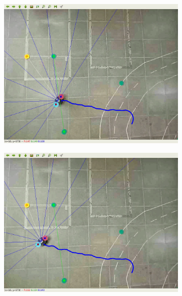 \begin{figure}[htbp]
\begin{subfigure}[b]{0.115\textwidth}
        \includegraphics[width=\textwidth]{images/test_env1/5.png}
    \end{subfigure}
    \hfill
    \begin{subfigure}[b]{0.115\textwidth}
        \includegraphics[width=\textwidth]{images/test_env1/6.png}
    \end{subfigure}
    \hfill
    \begin{subfigure}[b]{0.115\textwidth}

\end{subfigure}
\end{figure}
